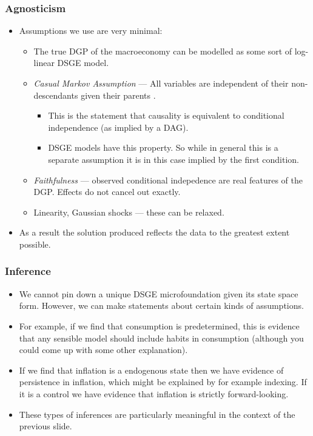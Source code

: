 \documentclass{beamer}
\begin{document}
\begin{frame}
    \frametitle{Agnosticism}
    \begin{itemize}
        \item Assumptions we use are very minimal:
        \begin{itemize}
            \item The true DGP of the macroeconomy can be modelled as some sort of log-linear DSGE model.
            \item \textit{Casual Markov Assumption} --- All variables are independent of their non-descendants given their parents \parencite{spirtes2016causal}.
            \begin{itemize}
                \item This is the statement that causality is equivalent to conditional independence (as implied by a DAG).
                \item DSGE models have this property. So while in general this is a separate assumption it is in this case implied by the first condition.
            \end{itemize}
            \item \textit{Faithfulness} --- observed conditional indepedence are real features of the DGP. Effects do not cancel out exactly.
            \item Linearity, Gaussian shocks --- these can be relaxed.
        \end{itemize}
        \item As a result the solution produced reflects the data to the greatest extent possible.
    \end{itemize}
\end{frame}

\begin{frame}
    \frametitle{Inference}
    \begin{itemize}
        \item We cannot pin down a unique DSGE microfoundation given its state space form. However, we can make statements about certain kinds of assumptions.
        \item For example, if we find that consumption is predetermined, this is evidence that any sensible model should include habits in consumption (although you could come up with some other explanation).
        \item If we find that inflation is a endogenous state then we have evidence of persistence in inflation, which might be explained by for example indexing. If it is a control we have evidence that inflation is strictly forward-looking.
        \item These types of inferences are particularly meaningful in the context of the previous slide.
    \end{itemize}
\end{frame}
\end{document}
